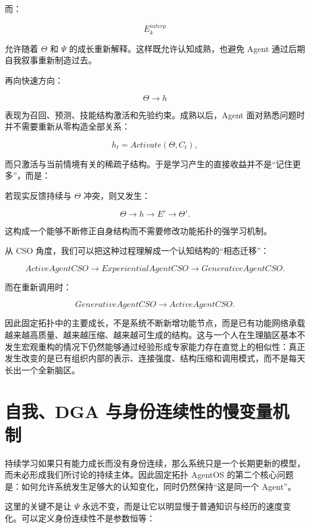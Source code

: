 而：

\[
E_k^{interp}
\]

允许随着 $\Theta$ 和 $\Psi$ 的成长重新解释。这样既允许认知成熟，也避免 Agent 通过后期自我叙事重新制造过去。

再向快速方向：

\[
\Theta\rightarrow h
\]

表现为召回、预测、技能结构激活和先验约束。成熟以后，Agent 面对熟悉问题时并不需要重新从零构造全部关系：

\[
h_t
=
Activate(\Theta,C_t),
\]

而只激活与当前情境有关的稀疏子结构。于是学习产生的直接收益并不是“记住更多”，而是：

\begin{statementbox}
\centering
{}
\end{statementbox}

若现实反馈持续与 $\Theta$ 冲突，则又发生：

\[
\Theta\rightarrow h\rightarrow E'\rightarrow\Theta'.
\]

这构成一个能够不断修正自身结构而不需要修改功能拓扑的强学习机制。

从 CSO 角度，我们可以把这种过程理解成一个认知结构的“相态迁移”：

\[
ActiveAgentCSO
\rightarrow
ExperientialAgentCSO
\rightarrow
GenerativeAgentCSO.
\]

而在重新调用时：

\[
GenerativeAgentCSO
\rightarrow
ActiveAgentCSO.
\]

因此固定拓扑中的主要成长，不是系统不断新增功能节点，而是已有功能网络承载越来越高质量、越来越压缩、越来越可生成的结构。这与一个人在生理脑区基本不发生宏观重构的情况下仍然能够通过经验形成专家能力存在直觉上的相似性：真正发生改变的是已有组织内部的表示、连接强度、结构压缩和调用模式，而不是每天长出一个全新脑区。

\section{自我、DGA 与身份连续性的慢变量机制}

持续学习如果只有能力成长而没有身份连续，那么系统只是一个长期更新的模型，而未必形成我们所讨论的持续主体。因此固定拓扑 AgentOS 的第二个核心问题是：如何允许系统发生足够大的认知变化，同时仍然保持“这是同一个 Agent”。

这里的关键不是让 $\Psi$ 永远不变，而是让它以明显慢于普通知识与经历的速度变化。可以定义身份连续性不是参数恒等：

